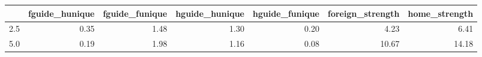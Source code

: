 \begin{tabular}{lrrrrrr}
\toprule
 & fguide_hunique & fguide_funique & hguide_hunique & hguide_funique & foreign_strength & home_strength \\
\midrule
2.5 & 0.35 & 1.48 & 1.30 & 0.20 & 4.23 & 6.41 \\
5.0 & 0.19 & 1.98 & 1.16 & 0.08 & 10.67 & 14.18 \\
\bottomrule
\end{tabular}
